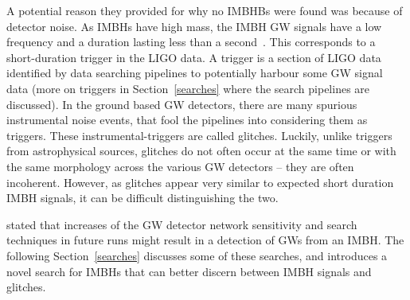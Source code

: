 A potential reason they provided for why no IMBHBs were found was
because of detector noise. As IMBHs have high mass, the IMBH GW signals
have a low frequency and a duration lasting less than a second~\cite{salemi2019search}. This corresponds to a short-duration trigger in the
LIGO data. A trigger is a section of LIGO data identified by data
searching pipelines to potentially harbour some GW signal data (more on
triggers in Section~\ref{searches} where the search pipelines are
discussed). In the ground based GW detectors, there are many spurious
instrumental noise events, that fool the pipelines into considering them
as triggers. These instrumental-triggers are called glitches. Luckily,
unlike triggers from astrophysical sources, glitches do not often occur
at the same time or with the same morphology across the various GW
detectors -- they are often incoherent. However, as glitches appear very
similar to expected short duration IMBH signals, it can be difficult
distinguishing the two. 

\citet{salemi2019search} stated that increases of
the GW detector network sensitivity and search techniques in future
runs might result in a detection of GWs from an IMBH. The following
Section~\ref{searches} discusses some of these searches, and introduces
a novel search for IMBHs that can better discern between IMBH signals
and glitches.

